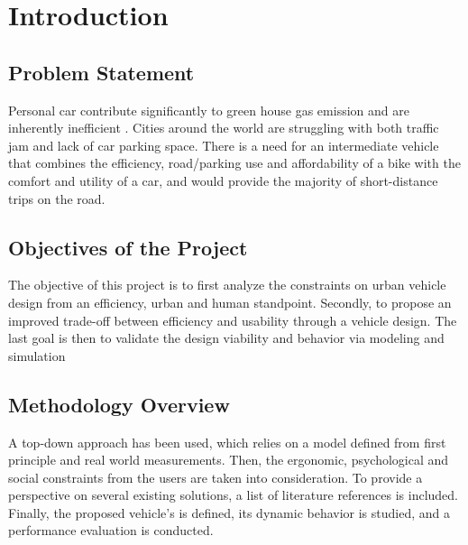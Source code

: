 \section{Introduction}

\subsection{Problem Statement}

Personal car contribute significantly to green house gas emission and are inherently inefficient \cite{us_epa_carbon_2015}. 
Cities around the world are struggling with both traffic jam and lack of car parking space.
There is a need for an intermediate vehicle that combines the efficiency, road/parking use and affordability of a bike with the comfort and utility of a car, and would provide the majority of short-distance trips on the road.

\subsection{Objectives of the Project}

The objective of this project is to first analyze the constraints on urban vehicle design from an efficiency, urban and human standpoint.
Secondly, to propose an improved trade-off between efficiency and usability through a vehicle design.
The last goal is then to validate the design viability and behavior via modeling and simulation

\subsection{Methodology Overview}

A top-down approach has been used, which relies on a model defined from first principle and real world measurements. Then, the ergonomic, psychological and social constraints from the users are taken into consideration. To provide a perspective on several existing solutions, a list of literature references is included.  Finally, the proposed vehicle's is defined, its dynamic behavior is studied, and a performance evaluation is conducted.